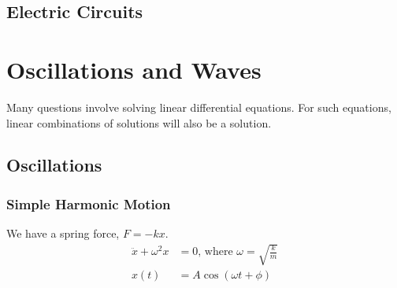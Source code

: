 \documentclass[a4paper]{article}
\begin{document}
\begin{multicols*}{2}
\subsection{Electric Circuits}
\section{Oscillations and Waves}
Many questions involve solving linear differential equations. For such
equations, linear combinations of solutions will also be a solution.
\subsection{Oscillations}
\subsubsection{Simple Harmonic Motion}
We have a spring force, $F=-kx$.
\begin{align*}
  \ddot{x}+\omega^2x&=0 \text{, where }\omega=\sqrt{\frac{k}{m}}\\
  x(t)&=A \cos(\omega t+\phi)
\end{align*}

\end{multicols*}
\end{document}
